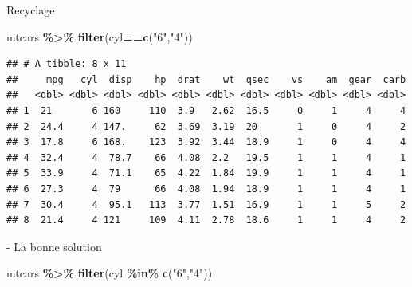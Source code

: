 \documentclass[
  ignorenonframetext,
]{beamer}
\newenvironment{Shaded}{\begin{snugshade}}{\end{snugshade}}
\newcommand{\FunctionTok}[1]{\textcolor[rgb]{0.13,0.29,0.53}{\textbf{#1}}}
\newcommand{\NormalTok}[1]{#1}
\newcommand{\SpecialCharTok}[1]{\textcolor[rgb]{0.81,0.36,0.00}{\textbf{#1}}}
\newcommand{\StringTok}[1]{\textcolor[rgb]{0.31,0.60,0.02}{#1}}
\begin{document}
\begin{frame}[fragile]{Recyclage}
\normalsize

\tiny

\begin{Shaded}
\begin{Highlighting}[]
\NormalTok{mtcars }\SpecialCharTok{\%\textgreater{}\%} \FunctionTok{filter}\NormalTok{(cyl}\SpecialCharTok{==}\FunctionTok{c}\NormalTok{(}\StringTok{"6"}\NormalTok{,}\StringTok{"4"}\NormalTok{))}
\end{Highlighting}
\end{Shaded}

\begin{verbatim}
## # A tibble: 8 x 11
##     mpg   cyl  disp    hp  drat    wt  qsec    vs    am  gear  carb
##   <dbl> <dbl> <dbl> <dbl> <dbl> <dbl> <dbl> <dbl> <dbl> <dbl> <dbl>
## 1  21       6 160     110  3.9   2.62  16.5     0     1     4     4
## 2  24.4     4 147.     62  3.69  3.19  20       1     0     4     2
## 3  17.8     6 168.    123  3.92  3.44  18.9     1     0     4     4
## 4  32.4     4  78.7    66  4.08  2.2   19.5     1     1     4     1
## 5  33.9     4  71.1    65  4.22  1.84  19.9     1     1     4     1
## 6  27.3     4  79      66  4.08  1.94  18.9     1     1     4     1
## 7  30.4     4  95.1   113  3.77  1.51  16.9     1     1     5     2
## 8  21.4     4 121     109  4.11  2.78  18.6     1     1     4     2
\end{verbatim}

\normalsize - La bonne solution

\tiny

\begin{Shaded}
\begin{Highlighting}[]
\NormalTok{mtcars }\SpecialCharTok{\%\textgreater{}\%} \FunctionTok{filter}\NormalTok{(cyl }\SpecialCharTok{\%in\%} \FunctionTok{c}\NormalTok{(}\StringTok{"6"}\NormalTok{,}\StringTok{"4"}\NormalTok{))}
\end{Highlighting}
\end{Shaded}


\end{frame}
\end{document}
